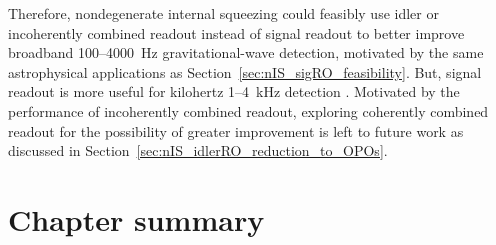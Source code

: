 Therefore, nondegenerate internal squeezing could feasibly use idler or incoherently combined readout instead of signal readout to better improve broadband 100--4000~Hz  gravitational-wave detection, motivated by the same astrophysical applications as Section~\ref{sec:nIS_sigRO_feasibility}. But, signal readout is more useful for kilohertz 1--4~kHz detection .
Motivated by the performance of incoherently combined readout, exploring coherently combined readout for the possibility of greater improvement is left to future work as discussed in Section~\ref{sec:nIS_idlerRO_reduction_to_OPOs}. %


\section{Chapter summary}

